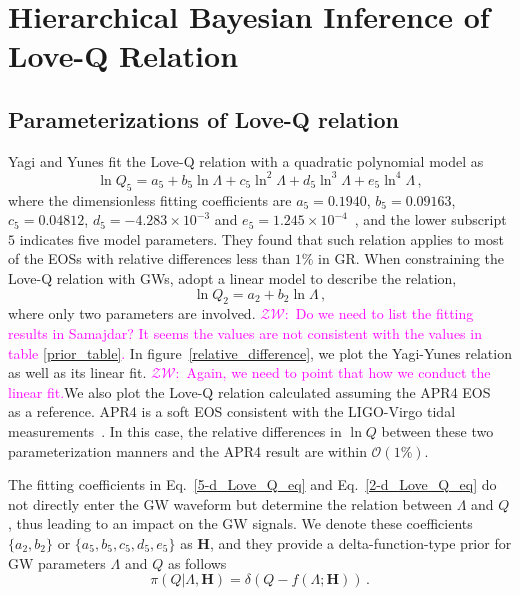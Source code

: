 \documentclass[a4paper,11pt]{article}
\newcommand{\ZW}[1]{\textcolor{magenta}{$\mathcal{ZW}$:~#1}}
\begin{document}
\section{Hierarchical Bayesian Inference of Love-Q Relation}
\label{sec:framework}

\subsection{Parameterizations of Love-Q relation} 
\label{subsec:framework_parameterization}
Yagi and Yunes fit the Love-Q relation with a quadratic polynomial model as~\cite{Yagi:2013bca,Yagi:2013awa,Yagi_2017}
\begin{equation}
\label{5-d_Love_Q_eq}
    \ln Q_{5}=a_5 + b_5 \ln \Lambda + c_5 \ln^2\Lambda + d_5 \ln^3\Lambda + e_5 \ln^4 \Lambda\,,
\end{equation}
where the dimensionless fitting coefficients are 
$a_5=0.1940$, $b_5=0.09163$, $c_5=0.04812$, 
$d_5=-4.283\times 10^{-3}$ and $e_5=1.245\times 10^{-4}$~\cite{Yagi_2017}, and 
the lower subscript $5$ indicates five model parameters.
They found that such relation applies to most of the EOSs with 
relative differences less than $1\%$ in GR. When constraining the Love-Q
relation with GWs, \citet{Samajdar:2020xrd} adopt a linear model to describe the
relation,
\begin{equation}
\label{2-d_Love_Q_eq}
    \ln Q_{2} = a_2 + b_2 \ln \Lambda\,,
\end{equation}
where only two parameters are involved. \ZW{Do we need to list the fitting
results in Samajdar? It seems the values are not consistent with the values in
table \ref{prior_table}.}
In figure~\ref{relative_difference}, we plot the Yagi-Yunes relation as well as 
its linear fit. \ZW{Again, we need to point that how we conduct the linear fit.}We also plot the Love-Q relation calculated assuming the APR4 
EOS~\cite{PhysRevC.58.1804} as a reference. APR4 is a soft EOS consistent with the 
LIGO-Virgo tidal measurements~\cite{LIGOScientific:2017vwq,LIGOScientific:2018cki,
LIGOScientific:2018hze}. In this case, the relative differences in $\ln Q$ between 
these two parameterization manners and the APR4 result are within $\mathcal{O}(1\%)$. 

The fitting coefficients in Eq.~\eqref{5-d_Love_Q_eq} and Eq.~\eqref{2-d_Love_Q_eq} 
do not directly enter the GW waveform but determine the relation between $\Lambda$ and $Q$, 
thus leading to an impact on the GW signals. We denote these coefficients $\{a_2, b_2\}$ or 
$\{a_5, b_5, c_5, d_5, e_5\}$ as $\bm{H}$, and they provide a delta-function-type prior for GW parameters $\Lambda$ and $Q$ as follows
\begin{equation}
\label{delta function prior}
\pi(Q|\Lambda,\bm{H}) = \delta(Q-f(\Lambda;\bm{H}))\,.
\end{equation}
\end{document}
